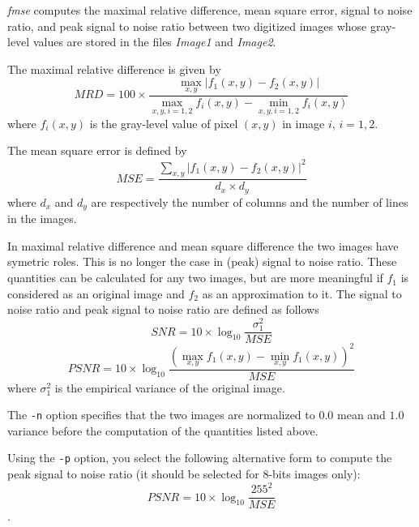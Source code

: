 {\em fmse} computes the maximal relative difference, mean square error, signal to noise ratio, and peak signal to noise ratio between two digitized images whose gray-level values are stored in the files {\em Image1} and {\em Image2}. 

The maximal relative difference is given by 
\[
MRD = 100 \times \frac{\max_{x,y}|f_{1}(x,y) - f_{2}(x,y)|}{\max_{x,y,i=1,2}f_{i}(x,y) - \min_{x,y,i=1,2}f_{i}(x,y)}
\]
where $f_{i}(x,y)$ is the gray-level value of pixel $(x,y)$ in image $i$, $i=1,2$. 

The mean square error is defined by 
\[
MSE = \frac{\sum_{x,y}|f_{1}(x,y) - f_{2}(x,y)|^{2}}{d_{x} \times d_{y}}
\]
where $d_{x}$ and $d_{y}$ are respectively the number of columns and the number of lines in the images.

In maximal relative difference and mean square difference the two images have symetric roles. This is no longer the case in (peak) signal to noise ratio. 
These quantities can be calculated for any two images, but are more meaningful if $f_{1}$ is considered as an original image and $f_{2}$ as an approximation to it. The signal to noise ratio and peak signal to noise ratio are defined as follows
\[
SNR = 10 \times \log_{10} \frac{\sigma_{1}^{2}}{MSE} 
\]
\[
PSNR = 10 \times \log_{10} \frac{(\max_{x,y}f_{1}(x,y) - \min_{x,y}f_{1}(x,y))^{2}}{MSE}
\]
where $\sigma_{1}^{2}$ is the empirical variance of the original image.

The \verb+-n+ option specifies that the two images are normalized to $0.0$ mean and $1.0$ variance before the computation of the quantities listed above.

Using the \verb+-p+ option, you select the following alternative form to compute
the peak signal to noise ratio (it should be selected for 8-bits images only):
\[
PSNR = 10 \times \log_{10} \frac{255^{2}}{MSE}
\].



